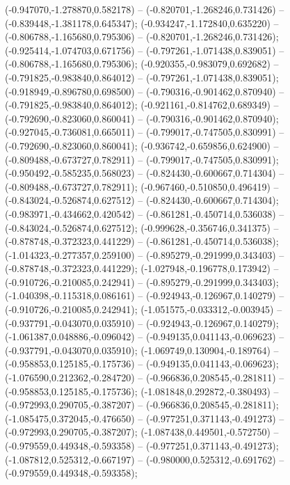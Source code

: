  (-0.947070,-1.278870,0.582178) -- (-0.820701,-1.268246,0.731426) -- (-0.839448,-1.381178,0.645347);
 (-0.934247,-1.172840,0.635220) -- (-0.806788,-1.165680,0.795306) -- (-0.820701,-1.268246,0.731426);
 (-0.925414,-1.074703,0.671756) -- (-0.797261,-1.071438,0.839051) -- (-0.806788,-1.165680,0.795306);
 (-0.920355,-0.983079,0.692682) -- (-0.791825,-0.983840,0.864012) -- (-0.797261,-1.071438,0.839051);
 (-0.918949,-0.896780,0.698500) -- (-0.790316,-0.901462,0.870940) -- (-0.791825,-0.983840,0.864012);
 (-0.921161,-0.814762,0.689349) -- (-0.792690,-0.823060,0.860041) -- (-0.790316,-0.901462,0.870940);
 (-0.927045,-0.736081,0.665011) -- (-0.799017,-0.747505,0.830991) -- (-0.792690,-0.823060,0.860041);
 (-0.936742,-0.659856,0.624900) -- (-0.809488,-0.673727,0.782911) -- (-0.799017,-0.747505,0.830991);
 (-0.950492,-0.585235,0.568023) -- (-0.824430,-0.600667,0.714304) -- (-0.809488,-0.673727,0.782911);
 (-0.967460,-0.510850,0.496419) -- (-0.843024,-0.526874,0.627512) -- (-0.824430,-0.600667,0.714304);
 (-0.983971,-0.434662,0.420542) -- (-0.861281,-0.450714,0.536038) -- (-0.843024,-0.526874,0.627512);
 (-0.999628,-0.356746,0.341375) -- (-0.878748,-0.372323,0.441229) -- (-0.861281,-0.450714,0.536038);
 (-1.014323,-0.277357,0.259100) -- (-0.895279,-0.291999,0.343403) -- (-0.878748,-0.372323,0.441229);
 (-1.027948,-0.196778,0.173942) -- (-0.910726,-0.210085,0.242941) -- (-0.895279,-0.291999,0.343403);
 (-1.040398,-0.115318,0.086161) -- (-0.924943,-0.126967,0.140279) -- (-0.910726,-0.210085,0.242941);
 (-1.051575,-0.033312,-0.003945) -- (-0.937791,-0.043070,0.035910) -- (-0.924943,-0.126967,0.140279);
 (-1.061387,0.048886,-0.096042) -- (-0.949135,0.041143,-0.069623) -- (-0.937791,-0.043070,0.035910);
 (-1.069749,0.130904,-0.189764) -- (-0.958853,0.125185,-0.175736) -- (-0.949135,0.041143,-0.069623);
 (-1.076590,0.212362,-0.284720) -- (-0.966836,0.208545,-0.281811) -- (-0.958853,0.125185,-0.175736);
 (-1.081848,0.292872,-0.380493) -- (-0.972993,0.290705,-0.387207) -- (-0.966836,0.208545,-0.281811);
 (-1.085475,0.372045,-0.476650) -- (-0.977251,0.371143,-0.491273) -- (-0.972993,0.290705,-0.387207);
 (-1.087438,0.449501,-0.572750) -- (-0.979559,0.449348,-0.593358) -- (-0.977251,0.371143,-0.491273);
 (-1.087812,0.525312,-0.667197) -- (-0.980000,0.525312,-0.691762) -- (-0.979559,0.449348,-0.593358);
